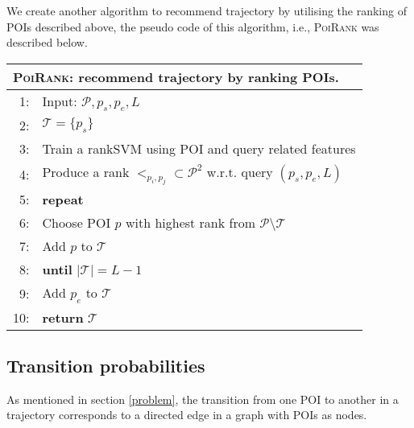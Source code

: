 %
We create another algorithm to recommend trajectory by utilising the ranking of POIs described above,
the pseudo code of this algorithm, i.e., \textsc{PoiRank} was described below.

\begin{table}
\centering
\small
\begin{tabular}{rl}
\hline
\multicolumn{2}{l}{\textsc{PoiRank}: recommend trajectory by ranking POIs.} \\
\hline
 1:& Input: $\mathcal{P}, p_s, p_e, L$ \\
 2:& $\mathcal{T} = \{p_s\}$ \\
 3:& Train a rankSVM using POI and query related features \\
 4:& Produce a rank $<_{p_i, p_j} \subset \mathcal{P}^2$ w.r.t. query $(p_s, p_e, L)$\\
 5:& \textbf{repeat} \\
 6:&\hspace{10pt} Choose POI $p$ with highest rank from $\mathcal{P} \setminus \mathcal{T}$ \\
 7:&\hspace{10pt} Add $p$ to $\mathcal{T}$ \\
 8:&\textbf{until} $|\mathcal{T}| = L-1$ \\
 9:& Add $p_e$ to $\mathcal{T}$ \\
10:& \textbf{return} $\mathcal{T}$ \\
\hline
\end{tabular}
\end{table}


\subsection{Transition probabilities}
\label{transition}
%
As mentioned in section \ref{problem}, the transition from one POI to another in a trajectory 
corresponds to a directed edge in a graph with POIs as nodes.


